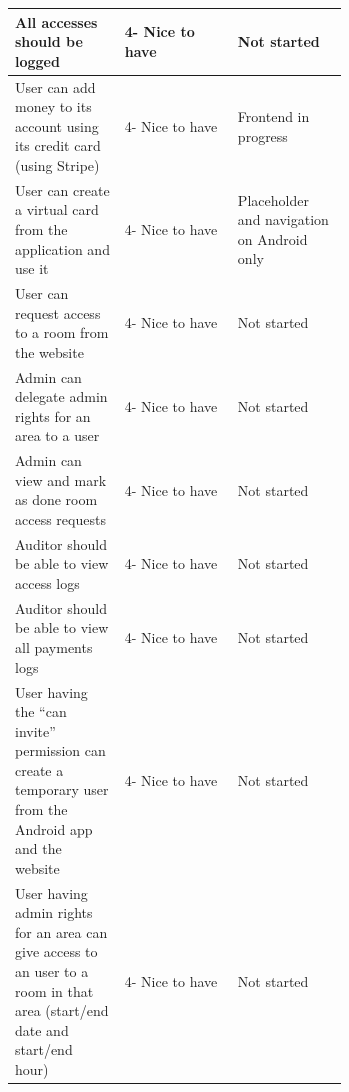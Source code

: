 \documentclass[twoside, openright,11pt,a4paper]{book}
\begin{document}
\begin{longtable}[c]{|p{0.33\linewidth}|l|p{0.33\linewidth}|}
All accesses should be logged                                                                                                                  & 4- Nice to have   & Not started                                      \\ \hline
User can add money to its account using its credit card (using Stripe)                                                                         & 4- Nice to have   & Frontend in progress                             \\ \hline
User can create a virtual card from the application and use it                                                                                 & 4- Nice to have   & Placeholder and navigation on Android only       \\ \hline
User can request access to a room from the website                                                                                             & 4- Nice to have   & Not started                                      \\ \hline
Admin can delegate admin rights for an area to a user                                                                                          & 4- Nice to have   & Not started                                      \\ \hline
Admin can view and mark as done room access requests                                                                                           & 4- Nice to have   & Not started                                      \\ \hline
Auditor should be able to view access logs                                                                                                     & 4- Nice to have   & Not started                                      \\ \hline
Auditor should be able to view all payments logs                                                                                               & 4- Nice to have   & Not started                                      \\ \hline
User having the “can invite” permission can create a temporary user from the Android app and the website                                       & 4- Nice to have   & Not started                                      \\ \hline
User having admin rights for an area can give access to an user to a room in that area (start/end date and start/end hour)                     & 4- Nice to have   & Not started                                      \\ \hline

\end{longtable}
\end{document}
